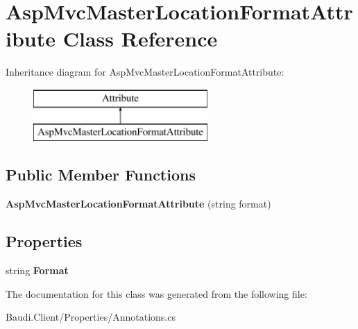 \hypertarget{class_asp_mvc_master_location_format_attribute}{}\section{Asp\+Mvc\+Master\+Location\+Format\+Attribute Class Reference}
\label{class_asp_mvc_master_location_format_attribute}
Inheritance diagram for Asp\+Mvc\+Master\+Location\+Format\+Attribute\+:\begin{figure}[H]
\begin{center}
\leavevmode
\includegraphics[height=2.000000cm]{class_asp_mvc_master_location_format_attribute}
\end{center}
\end{figure}
\subsection*{Public Member Functions}
\begin{DoxyCompactItemize}
\item 
\hypertarget{class_asp_mvc_master_location_format_attribute_ac71ce5737a8427494201b92935523fd9}{}{\bfseries Asp\+Mvc\+Master\+Location\+Format\+Attribute} (string format)\label{class_asp_mvc_master_location_format_attribute_ac71ce5737a8427494201b92935523fd9}

\end{DoxyCompactItemize}
\subsection*{Properties}
\begin{DoxyCompactItemize}
\item 
\hypertarget{class_asp_mvc_master_location_format_attribute_a12e48477c571f14556915ebdef251912}{}string {\bfseries Format}\label{class_asp_mvc_master_location_format_attribute_a12e48477c571f14556915ebdef251912}

\end{DoxyCompactItemize}


The documentation for this class was generated from the following file\+:\begin{DoxyCompactItemize}
\item 
Baudi.\+Client/\+Properties/Annotations.\+cs\end{DoxyCompactItemize}
